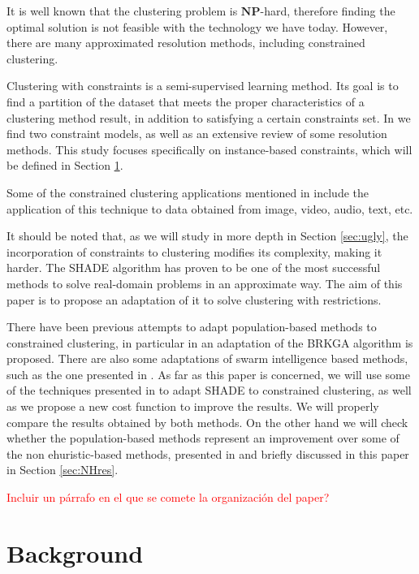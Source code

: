 \documentclass[review]{elsarticle}
\begin{document}
It is well known that the clustering problem is $\mathbf{NP}$-hard, therefore finding the optimal solution is not feasible with the technology we have today. However, there are many approximated resolution methods, including constrained clustering.

Clustering with constraints is a semi-supervised learning method. Its goal is to find a partition of the dataset that meets the proper characteristics of a clustering method result, in addition to satisfying a certain constraints set. In \cite{davidson2007survey} we find two constraint models, as well as an extensive review of some resolution methods. This study focuses specifically on instance-based constraints, which will be defined in Section \ref{sec:background}.

Some of the constrained clustering applications mentioned in \cite{davidson2007survey} include the application of this technique to data obtained from image, video, audio, text, etc.

It should be noted that, as we will study in more depth in Section \ref{sec:ugly}, the incorporation of constraints to clustering modifies its complexity, making it harder. The SHADE algorithm has proven to be one of the most successful methods to solve real-domain problems in an approximate way. The aim of this paper is to propose an adaptation of it to solve clustering with restrictions. 

There have been previous attempts to adapt population-based methods to constrained clustering, in particular in \cite{de2017comparison} an adaptation of the BRKGA algorithm is proposed.
There are also some adaptations of swarm intelligence based methods, such as the one presented in \cite{xu2013improving}. As far as this paper is concerned, we will use some of the techniques presented in \cite{de2017comparison} to adapt SHADE to constrained clustering, as well as we propose a new cost function to improve the results. We will properly compare the results obtained by both methods. On the other hand we will check whether the population-based methods represent an improvement over some of the non ehuristic-based methods, presented in \cite{davidson2007survey} and briefly discussed in this paper in Section \ref{sec:NHres}.

\textcolor{red}{Incluir un párrafo en el que se comete la organización del paper?}

\section{Background} \label{sec:background}
\end{document}

